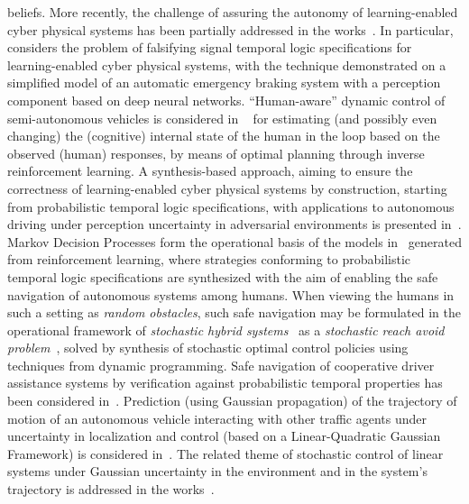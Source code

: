 {beliefs}. More recently, the challenge of assuring the autonomy of learning-enabled cyber physical systems has been partially addressed in the works~\cite{SeshiaNFM17,SeshiaSadigh18a,SeshiaSasdigh18b}. In particular, \cite{SeshiaNFM17} considers the problem of falsifying signal temporal logic specifications for learning-enabled cyber physical systems, with the technique demonstrated on a simplified model of an automatic emergency braking system with a perception component based on deep neural networks. ``Human-aware'' dynamic control of semi-autonomous vehicles is considered in ~\cite{SeshiaSadigh18a} for estimating (and possibly even changing) the (cognitive) internal state of the human in the loop based on the observed (human) responses, by means of optimal planning through inverse reinforcement learning. A synthesis-based approach, aiming to ensure the correctness of learning-enabled cyber physical systems by construction, starting from probabilistic temporal logic specifications, with applications to autonomous driving under perception uncertainty in adversarial  environments is presented in~\cite{SeshiaSasdigh18b}. Markov Decision Processes form the operational basis of the models in~\cite{Topcu18} generated from reinforcement learning, where strategies conforming to probabilistic temporal logic specifications are synthesized with the aim of enabling the safe navigation of autonomous systems among humans. When viewing the humans in such a setting as \emph{random obstacles}, such safe navigation may be formulated in the operational framework of \emph{stochastic hybrid systems}~\cite{LygerosPrandiniSHS,FraenzleProcosSHS} as a \emph{stochastic reach avoid problem}~\cite{TomlinHSCC2011}, solved by synthesis of stochastic optimal control policies using techniques from dynamic programming. Safe navigation of cooperative driver assistance systems by verification against probabilistic temporal properties has been considered in~\cite{DammMSCS13}. Prediction (using Gaussian propagation)  of the trajectory of motion of an autonomous vehicle  interacting with other traffic agents under uncertainty in localization and control (based on a Linear-Quadratic Gaussian Framework) is considered in~\cite{XuDolanICRA2014}. The related theme of stochastic control of linear systems under Gaussian uncertainty in the environment and in the system's trajectory is addressed in the works~\cite{VitusTomlinCDC2012,VitusTomlinCDC2013}. 







